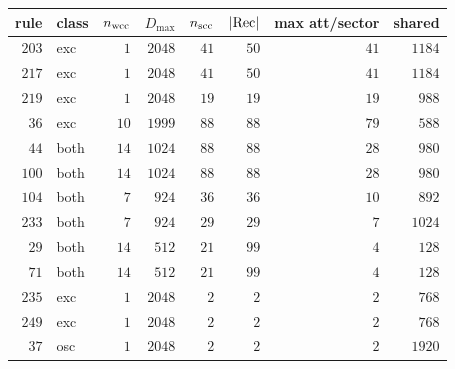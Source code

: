 \begin{tabular}{rlrrrrrr}
\hline
rule & class & $n_{\rm wcc}$ & $D_{\max}$ & $n_{\rm scc}$ & $|{\rm Rec}|$ & max att/sector & shared \\
\hline
$203$ & exc & $1$ & $2048$ & $41$ & $50$ & $41$ & $1184$ \\
$217$ & exc & $1$ & $2048$ & $41$ & $50$ & $41$ & $1184$ \\
$219$ & exc & $1$ & $2048$ & $19$ & $19$ & $19$ & $988$ \\
$36$ & exc & $10$ & $1999$ & $88$ & $88$ & $79$ & $588$ \\
$44$ & both & $14$ & $1024$ & $88$ & $88$ & $28$ & $980$ \\
$100$ & both & $14$ & $1024$ & $88$ & $88$ & $28$ & $980$ \\
$104$ & both & $7$ & $924$ & $36$ & $36$ & $10$ & $892$ \\
$233$ & both & $7$ & $924$ & $29$ & $29$ & $7$ & $1024$ \\
$29$ & both & $14$ & $512$ & $21$ & $99$ & $4$ & $128$ \\
$71$ & both & $14$ & $512$ & $21$ & $99$ & $4$ & $128$ \\
$235$ & exc & $1$ & $2048$ & $2$ & $2$ & $2$ & $768$ \\
$249$ & exc & $1$ & $2048$ & $2$ & $2$ & $2$ & $768$ \\
$37$ & osc & $1$ & $2048$ & $2$ & $2$ & $2$ & $1920$ \\
\hline
\end{tabular}
